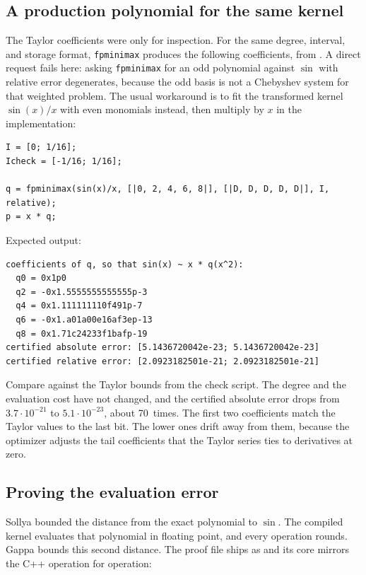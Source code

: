 \documentclass[manuscript, nonacm]{acmart}
\begin{document}
  \subsection{A production polynomial for the same kernel}
  \label{sec:sinprod}

  The Taylor coefficients were only for inspection. For the same degree,
  interval, and storage format, \texttt{fpminimax} produces the following
  coefficients, from
  .
  A direct request fails here: asking \texttt{fpminimax} for an odd
  polynomial against $\sin$ with relative error degenerates, because the
  odd basis is not a Chebyshev system for that weighted problem. The
  usual workaround is to fit the transformed kernel $\sin(x)/x$ with even
  monomials instead, then multiply by $x$ in the implementation:

  \begin{lstlisting}[style=sollya]
I = [0; 1/16];
Icheck = [-1/16; 1/16];

q = fpminimax(sin(x)/x, [|0, 2, 4, 6, 8|], [|D, D, D, D, D|], I, relative);
p = x * q;
  \end{lstlisting}

  Expected output:

  \begin{lstlisting}[style=output]
coefficients of q, so that sin(x) ~ x * q(x^2):
  q0 = 0x1p0
  q2 = -0x1.5555555555555p-3
  q4 = 0x1.111111110f491p-7
  q6 = -0x1.a01a00e16af3ep-13
  q8 = 0x1.71c24233f1bafp-19
certified absolute error: [5.1436720042e-23; 5.1436720042e-23]
certified relative error: [2.0923182501e-21; 2.0923182501e-21]
  \end{lstlisting}

  Compare against the Taylor bounds from the check script. The degree and
  the evaluation cost have not changed, and the certified absolute error
  drops from $3.7 \cdot 10^{-21}$ to $5.1 \cdot 10^{-23}$, about 70~times.
  The first two coefficients match the Taylor values to the last bit. The
  lower ones drift away from them, because the optimizer adjusts the tail
  coefficients that the Taylor series ties to derivatives at zero.

  \subsection{Proving the evaluation error}
  \label{sec:sinproof}

  Sollya bounded the distance from the exact polynomial to $\sin$. The
  compiled kernel evaluates that polynomial in floating point, and every
  operation rounds. Gappa bounds this second distance. The proof file
  ships as
   and
  its core mirrors the C++ operation for operation:
\end{document}

